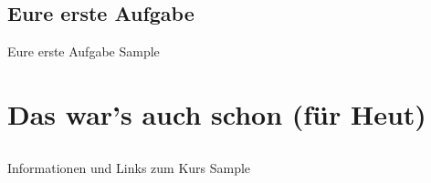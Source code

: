 \subsection{Eure erste Aufgabe}
\begin{frame}{Eure erste Aufgabe}
	Sample
\end{frame}



\section{Das war's auch schon (für Heut)}


\subsection{}
\begin{frame}{Informationen und Links zum Kurs}
	Sample
\end{frame}


